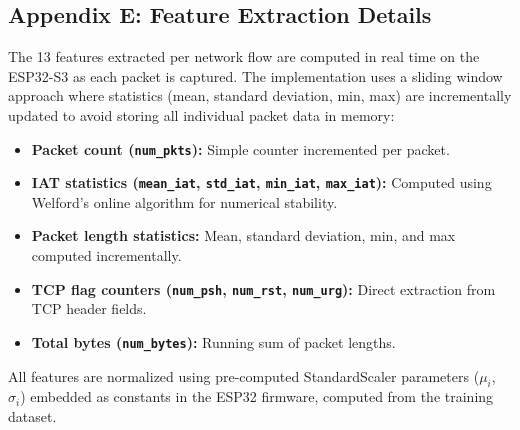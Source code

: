 \begin{appendix}
\section{Appendix E: Feature Extraction Details}
\label{anx:features}

The 13 features extracted per network flow are computed in real time on the ESP32-S3 as each packet is captured. The implementation uses a sliding window approach where statistics (mean, standard deviation, min, max) are incrementally updated to avoid storing all individual packet data in memory:

\begin{itemize}
    \item \textbf{Packet count (\texttt{num\_pkts}):} Simple counter incremented per packet.
    \item \textbf{IAT statistics (\texttt{mean\_iat}, \texttt{std\_iat}, \texttt{min\_iat}, \texttt{max\_iat}):} Computed using Welford's online algorithm for numerical stability.
    \item \textbf{Packet length statistics:} Mean, standard deviation, min, and max computed incrementally.
    \item \textbf{TCP flag counters (\texttt{num\_psh}, \texttt{num\_rst}, \texttt{num\_urg}):} Direct extraction from TCP header fields.
    \item \textbf{Total bytes (\texttt{num\_bytes}):} Running sum of packet lengths.
\end{itemize}

All features are normalized using pre-computed StandardScaler parameters ($\mu_i$, $\sigma_i$) embedded as constants in the ESP32 firmware, computed from the training dataset.

\end{appendix}
